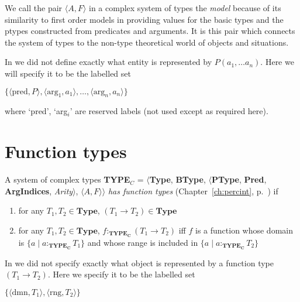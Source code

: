We call the pair $\langle A,F\rangle$ in a complex system of types the
\textit{model} because of its similarity to first order models in
providing values for the basic types and the ptypes constructed from
predicates and arguments.  It is this pair which connects the system
of types to the non-type theoretical world of objects and situations.

In \cite{Cooper2012} we did not define exactly what entity is
represented by $P(a_1,\ldots a_n)$.  Here we will specify it to be the
labelled set

$\{\langle\mathrm{pred},P\rangle,\langle\mathrm{arg}_1,a_1\rangle,\ldots,\langle\mathrm{arg}_n,a_n\rangle\}$

where `pred', `arg$_i$' are reserved labels (not used except as
required here).




\section{Function types}
\label{app:funtypes}

A system of complex types {\bf TYPE$_C$} = $\langle${\bf Type}, {\bf BType},
$\langle$\textbf{PType}, {\bf Pred}, \textbf{ArgIndices}, {\it
  Arity\/}$\rangle$, $\langle A,F\rangle$$\rangle$ \textit{has
  function types} (Chapter~\ref{ch:percint}, p.~\pageref{ex:funtypes}) if
\begin{enumerate} 
 
\item for any $T_1,T_2 \in \textbf{Type}$, $(T_1\rightarrow T_2) \in \textbf{Type}$ 
 
\item for any $T_1,T_2 \in \textbf{Type}$, $f:_{\mathbf{TYPE_C}}(T_1\rightarrow T_2)$ iff
  $f$ is a function whose domain is $\{a\mid
  a:_{\mathbf{TYPE_C}}T_1\}$ and whose range is included in $\{a\mid a:_{\mathbf{TYPE_C}}T_2\}$ 
 
\end{enumerate}

In \cite{Cooper2012} we did not specify exactly what object is
represented by a function type $(T_1\rightarrow T_2)$.  Here we
specify it to be the labelled set

$\{\langle\mathrm{dmn},T_1\rangle,\langle\mathrm{rng},T_2\rangle\}$

